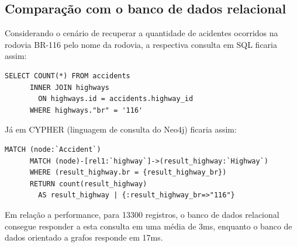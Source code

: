       \subsection*{Comparação com o banco de dados relacional}
      
	Considerando o cenário de recuperar a quantidade de acidentes
	ocorridos na rodovia BR-116 pelo nome da rodovia, a respectiva
	consulta em SQL ficaria assim:
      
	\lstset{language=SQL}
	\begin{lstlisting}[frame=single, caption=Consulta em SQL]
	  SELECT COUNT(*) FROM accidents
	  INNER JOIN highways 
	    ON highways.id = accidents.highway_id
	  WHERE highways."br" = '116'
	\end{lstlisting}
	
	Já em CYPHER (linguagem de consulta do Neo4j) ficaria assim:
	
	\lstset{language=SQL}
	\begin{lstlisting}[frame=single]
	  MATCH (node:`Accident`) 
	  MATCH (node)-[rel1:`highway`]->(result_highway:`Highway`)
	  WHERE (result_highway.br = {result_highway_br})
	  RETURN count(result_highway) 
	    AS result_highway | {:result_highway_br=>"116"}
	\end{lstlisting}

	Em relação a performance, para 13300 registros, o banco de dados relacional
	consegue responder a esta consulta em uma média de 3ms,
	enquanto o banco de dados orientado a grafos responde em 17ms.